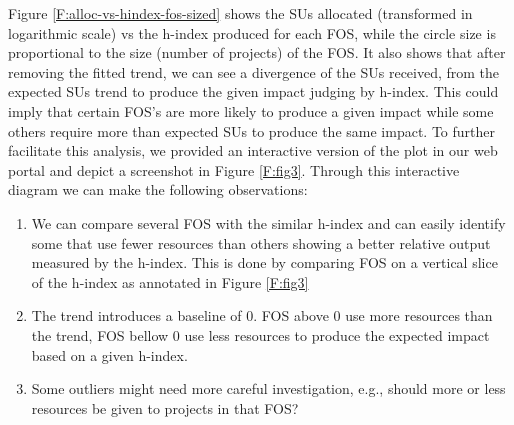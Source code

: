 \documentclass{sig-alternate}
\begin{document}
Figure \ref{F:alloc-vs-hindex-fos-sized} shows the SUs allocated (transformed in logarithmic scale) vs the h-index produced for each FOS, while the circle size is proportional to the size (number of projects) of the FOS. It also shows that after removing the fitted trend, we can see a divergence of the SUs received, from the expected SUs trend to produce the given impact judging by h-index. This could imply that certain FOS's are more likely to produce a given impact while some others require more than expected SUs to produce the same impact. To further facilitate this analysis, we provided an interactive version of the plot in our web portal \cite{www-tasdeviu} and depict a screenshot in Figure \ref{F:fig3}. Through this interactive diagram we can make the following observations: 
 
\begin{enumerate} 
 
\item We can compare several FOS with the similar h-index and can easily identify some that use fewer resources than others showing a better relative output measured by the h-index. This is done by comparing FOS on a vertical slice of the h-index as annotated in Figure \ref{F:fig3} 
 
\item The trend introduces a baseline of 0. FOS above 0 use more resources than the trend, FOS bellow 0 use less resources to produce the expected impact based on a given h-index. 
 
\item Some outliers might need more careful investigation, e.g., should more or less resources be given to projects in that FOS? 
 
\end{enumerate} 
 
\end{document}
